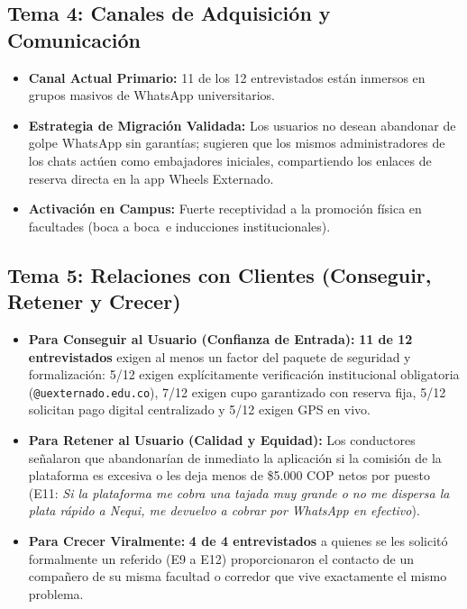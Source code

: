 \documentclass[11pt,a4paper]{article}
\begin{document}
\subsection{Tema 4: Canales de Adquisici\'on y Comunicaci\'on}
\begin{itemize}[leftmargin=*]
    \item \textbf{Canal Actual Primario:} 11 de los 12 entrevistados est\'an inmersos en grupos masivos de WhatsApp universitarios.
    \item \textbf{Estrategia de Migraci\'on Validada:} Los usuarios no desean abandonar de golpe WhatsApp sin garant\'ias; sugieren que los mismos administradores de los chats act\'uen como embajadores iniciales, compartiendo los enlaces de reserva directa en la app Wheels Externado.
    \item \textbf{Activaci\'on en Campus:} Fuerte receptividad a la promoci\'on f\'isica en facultades (\guillemotleft boca a boca\guillemotright\ e inducciones institucionales).
\end{itemize}

\subsection{Tema 5: Relaciones con Clientes (Conseguir, Retener y Crecer)}
\begin{itemize}[leftmargin=*]
    \item \textbf{Para Conseguir al Usuario (Confianza de Entrada):} \textbf{11 de 12 entrevistados} exigen al menos un factor del paquete de seguridad y formalizaci\'on: 5/12 exigen expl\'icitamente verificaci\'on institucional obligatoria (\texttt{@uexternado.edu.co}), 7/12 exigen cupo garantizado con reserva fija, 5/12 solicitan pago digital centralizado y 5/12 exigen GPS en vivo.
    \item \textbf{Para Retener al Usuario (Calidad y Equidad):} Los conductores se\~nalaron que abandonar\'ian de inmediato la aplicaci\'on si la comisi\'on de la plataforma es excesiva o les deja menos de \$5.000 COP netos por puesto (E11: \textit{\guillemotleft Si la plataforma me cobra una tajada muy grande o no me dispersa la plata r\'apido a Nequi, me devuelvo a cobrar por WhatsApp en efectivo\guillemotright}).
    \item \textbf{Para Crecer Viralmente:} \textbf{4 de 4 entrevistados} a quienes se les solicit\'o formalmente un referido (E9 a E12) proporcionaron el contacto de un compa\~nero de su misma facultad o corredor que vive exactamente el mismo problema.
\end{itemize}
\end{document}
